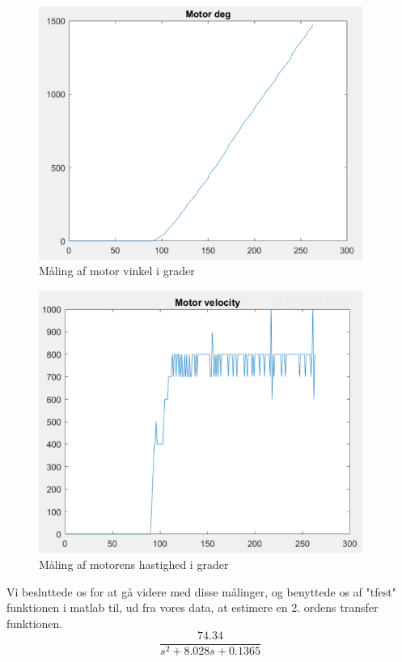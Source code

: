 \begin{figure}[H]
	\centering
	\includegraphics[width = 300pt]{Img/Motor_deg_graf.png}
	\caption{Måling af motor vinkel i grader}
	\label{fig:Motor_deg_graf}
\end{figure}

\begin{figure}[H]
	\centering
	\includegraphics[width = 300pt]{Img/Motor_velocity_graf.png}
	\caption{Måling af motorens hastighed i grader}
	\label{fig:Motor_velocity_graf}
\end{figure}

Vi besluttede os for at gå videre med disse målinger, og benyttede os af "tfest" funktionen i matlab til, ud fra vores data, at estimere en 2. ordens transfer funktionen. 
\begin{equation}
\frac{74.34}{s^2+8.028s+0.1365}
\end{equation}


